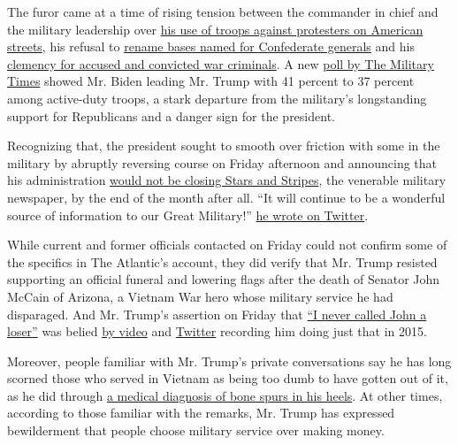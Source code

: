 The furor came at a time of rising tension between the commander in
chief and the military leadership over
\href{https://www.nytimes3xbfgragh.onion/2020/06/05/us/politics/protests-milley-trump.html}{his
use of troops against protesters on American streets}, his refusal to
\href{https://www.nytimes3xbfgragh.onion/2020/06/10/us/politics/trump-rejects-renaming-military-bases.html}{rename
bases named for Confederate generals} and his
\href{https://www.nytimes3xbfgragh.onion/2019/11/15/us/trump-pardons.html}{clemency
for accused and convicted war criminals}. A new
\href{https://www.militarytimes.com/news/pentagon-congress/2020/08/31/as-trumps-popularity-slips-in-latest-military-times-poll-more-troops-say-theyll-vote-for-biden/}{poll
by The Military Times} showed Mr. Biden leading Mr. Trump with 41
percent to 37 percent among active-duty troops, a stark departure from
the military's longstanding support for Republicans and a danger sign
for the president.

Recognizing that, the president sought to smooth over friction with some
in the military by abruptly reversing course on Friday afternoon and
announcing that his administration
\href{https://www.nytimes3xbfgragh.onion/2020/09/04/us/politics/stars-and-stripes-trump-military.html}{would
not be closing Stars and Stripes}, the venerable military newspaper, by
the end of the month after all. ``It will continue to be a wonderful
source of information to our Great Military!''
\href{https://twitter.com/realDonaldTrump/status/1301968873487564802}{he
wrote on Twitter}.

While current and former officials contacted on Friday could not confirm
some of the specifics in The Atlantic's account, they did verify that
Mr. Trump resisted supporting an official funeral and lowering flags
after the death of Senator John McCain of Arizona, a Vietnam War hero
whose military service he had disparaged. And Mr. Trump's assertion on
Friday that
\href{https://twitter.com/realDonaldTrump/status/1301710819349204992}{``I
never called John a loser''} was belied
\href{https://www.youtube.com/watch?v=7k1ajHAeXMU}{by video} and
\href{https://twitter.com/realDonaldTrump/status/622522682245033984}{Twitter}
recording him doing just that in 2015.

Moreover, people familiar with Mr. Trump's private conversations say he
has long scorned those who served in Vietnam as being too dumb to have
gotten out of it, as he did through
\href{https://www.nytimes3xbfgragh.onion/2018/12/26/us/politics/trump-vietnam-draft-exemption.html}{a
medical diagnosis of bone spurs in his heels}. At other times, according
to those familiar with the remarks, Mr. Trump has expressed bewilderment
that people choose military service over making money.

